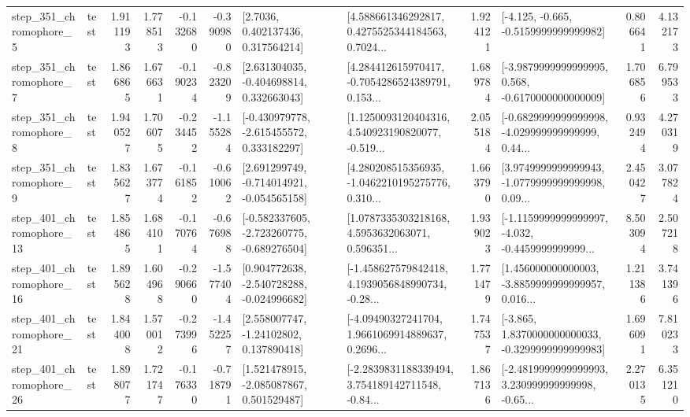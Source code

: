 \begin{tabular}{llrrrrllrlrr}
   step\_351\_chromophore\_5 &      test &      1.911193 &    1.778513 &     -0.132680 & -0.390980 &          [2.7036, 0.402137436, 0.317564214] &  [4.588661346292817, 0.4275525344184563, 0.7024... &       1.924121 &              [-4.125, -0.665, -0.5159999999999982] &            0.806641 &          4.132173 \\
   step\_351\_chromophore\_7 &      test &      1.866865 &    1.676631 &     -0.190234 & -0.823209 &    [2.631304035, -0.404698814, 0.332663043] &  [4.284412615970417, -0.7054286524389791, 0.153... &       1.689784 &  [-3.9879999999999995, 0.568, -0.6170000000000009] &            1.706856 &          6.799533 \\
   step\_351\_chromophore\_8 &      test &      1.940527 &    1.706075 &     -0.234452 & -1.155284 &   [-0.430979778, -2.615455572, 0.333182297] &  [1.1250093120404316, 4.540923190820077, -0.519... &       2.055184 &  [-0.6829999999999998, -4.029999999999999, 0.44... &            0.932494 &          4.270319 \\
   step\_351\_chromophore\_9 &      test &      1.835627 &    1.673774 &     -0.161852 & -0.610062 &   [2.691299749, -0.714014921, -0.054565158] &  [4.280208515356935, -1.0462210195275776, 0.310... &       1.663790 &  [3.9749999999999943, -1.0779999999999998, 0.09... &            2.450427 &          3.077824 \\
  step\_401\_chromophore\_13 &      test &      1.854865 &    1.684101 &     -0.170764 & -0.676988 &  [-0.582337605, -2.723260775, -0.689276504] &  [1.0787335303218168, 4.5953632063071, 0.596351... &       1.939023 &  [-1.1159999999999997, -4.032, -0.4459999999999... &            8.503094 &          2.507218 \\
  step\_401\_chromophore\_16 &      test &      1.895628 &    1.604968 &     -0.290660 & -1.577404 &   [0.904772638, -2.540728288, -0.024996682] &  [-1.458627579842418, 4.1939056848990734, -0.28... &       1.771479 &  [1.456000000000003, -3.8859999999999957, 0.016... &            1.211386 &          3.741396 \\
  step\_401\_chromophore\_21 &      test &      1.844008 &    1.570012 &     -0.273996 & -1.452257 &     [2.558007747, -1.24102802, 0.137890418] &  [-4.09490327241704, 1.9661069914889637, 0.2696... &       1.747537 &  [-3.865, 1.8370000000000033, -0.3299999999999983] &            1.696091 &          7.810233 \\
  step\_401\_chromophore\_26 &      test &      1.898077 &    1.721747 &     -0.176330 & -0.718791 &    [1.521478915, -2.085087867, 0.501529487] &  [-2.2839831188339494, 3.754189142711548, -0.84... &       1.867136 &  [-2.4819999999999993, 3.230999999999998, -0.65... &            2.270135 &          6.351210 \\

\end{tabular}
